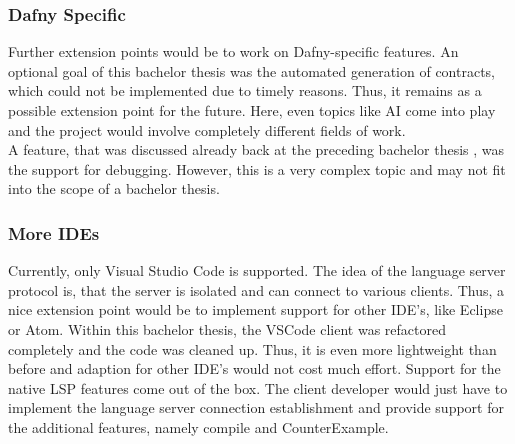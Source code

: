 \subsubsection{Dafny Specific}
Further extension points would be to work on Dafny-specific features.
An optional goal of this bachelor thesis was the automated generation of contracts, which could not be implemented due to timely reasons.
Thus, it remains as a possible extension point for the future.
Here, even topics like AI come into play and the project would involve completely different fields of work.\\

A feature, that was discussed already back at the preceding bachelor thesis \cite{ba}, was the support for debugging.
However, this is a very complex topic and may not fit into the scope of a bachelor thesis.

\subsubsection{More IDEs}
Currently, only Visual Studio Code is supported.
The idea of the language server protocol is, that the server is isolated and can connect to various clients.
Thus, a nice extension point would be to implement support for other IDE's, like Eclipse or Atom.
Within this bachelor thesis, the VSCode client was refactored completely and the code was cleaned up.
Thus, it is even more lightweight than before and adaption for other IDE's would not cost much effort.
Support for the native LSP features come out of the box.
The client developer would just have to implement the language server connection establishment and provide support for the additional features, namely compile and CounterExample.

